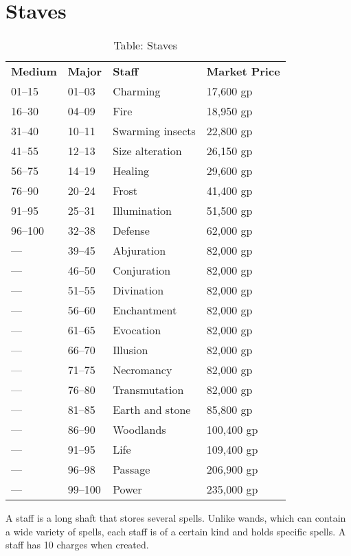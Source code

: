 \section{Staves}

\label{f0}
\begin{table}[]
\sffamily
\caption{Table: Staves}
\begin{tabular}{llll}
\textbf{Medium} & \textbf{Major} & \textbf{Staff} & \textbf{Market Price}\\
01--15 & 01--03 & Charming & 17,600 gp \\
 16--30 & 04--09 & Fire & 18,950 gp \\
 31--40 & 10--11 & Swarming insects & 22,800 gp \\
 41--55 & 12--13 & Size alteration & 26,150 gp \\
 56--75 & 14--19 & Healing & 29,600 gp \\
 76--90 & 20--24 & Frost & 41,400 gp \\
 91--95 & 25--31 & Illumination & 51,500 gp \\
 96--100 & 32--38 & Defense & 62,000 gp \\
 --- & 39--45 & Abjuration & 82,000 gp \\
 --- & 46--50 & Conjuration & 82,000 gp \\
 --- & 51--55 & Divination & 82,000 gp \\
 --- & 56--60 & Enchantment & 82,000 gp \\
 --- & 61--65 & Evocation & 82,000 gp \\
 --- & 66--70 & Illusion & 82,000 gp \\
 --- & 71--75 & Necromancy & 82,000 gp \\
 --- & 76--80 & Transmutation & 82,000 gp \\
 --- & 81--85 & Earth and stone & 85,800 gp \\
 --- & 86--90 & Woodlands & 100,400 gp \\
 --- & 91--95 & Life & 109,400 gp \\
 --- & 96--98 & Passage & 206,900 gp \\
 --- & 99--100 & Power & 235,000 gp\\
\end{tabular}
\end{table}
				
A staff is a long shaft that stores several spells. Unlike wands, which can contain a wide variety of spells, each staff is of a certain kind and holds specific spells. A staff has 10 charges when created.
				
